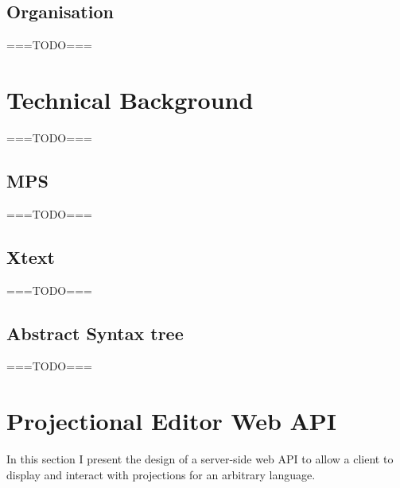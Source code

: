\documentclass{article}
\begin{document}
\subsection{Organisation} 
===TODO===

\section{Technical Background}
===TODO===
\subsection{MPS}
===TODO===
\subsection{Xtext}
===TODO===
\subsection{Abstract Syntax tree}
===TODO===


\section{Projectional Editor Web API}
In this section I present the design of a server-side web API to allow a client to display and interact with projections for an arbitrary language. 
\end{document}
